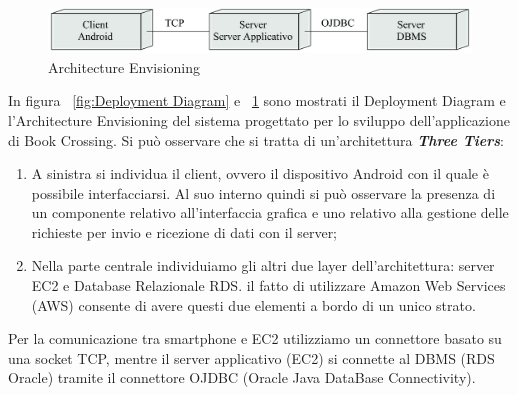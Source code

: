 
\begin{figure}[h]
	\includegraphics[width=\textwidth]{Immagini/Architecture_Envisoring}
	\caption{Architecture Envisioning}
	\label{fig:ArchitectureEnvisoring}
\end{figure}
\noindent
In figura ~\ref{fig:Deployment Diagram} e ~\ref{fig:ArchitectureEnvisoring} sono mostrati il Deployment Diagram e l'Architecture Envisioning del sistema progettato per lo sviluppo dell’applicazione di Book Crossing. Si può osservare che si tratta di un’architettura \textbf{\textit{Three Tiers}}:
\begin{enumerate}
	\item A sinistra si individua il client, ovvero il dispositivo Android con il quale è possibile interfacciarsi. Al suo interno quindi si può osservare la presenza di un componente relativo all’interfaccia grafica e uno relativo alla gestione delle richieste per invio e ricezione di dati con il server;
	\item Nella parte centrale individuiamo gli altri due layer dell’architettura: server EC2 e Database Relazionale RDS. il fatto di utilizzare Amazon Web Services (AWS) consente di avere questi due elementi a bordo di un unico strato.
\end{enumerate}
\noindent
Per la comunicazione tra smartphone e EC2 utilizziamo un connettore basato su una socket TCP, mentre il server applicativo (EC2) si connette al DBMS (RDS Oracle) tramite il connettore OJDBC (Oracle Java DataBase Connectivity). 